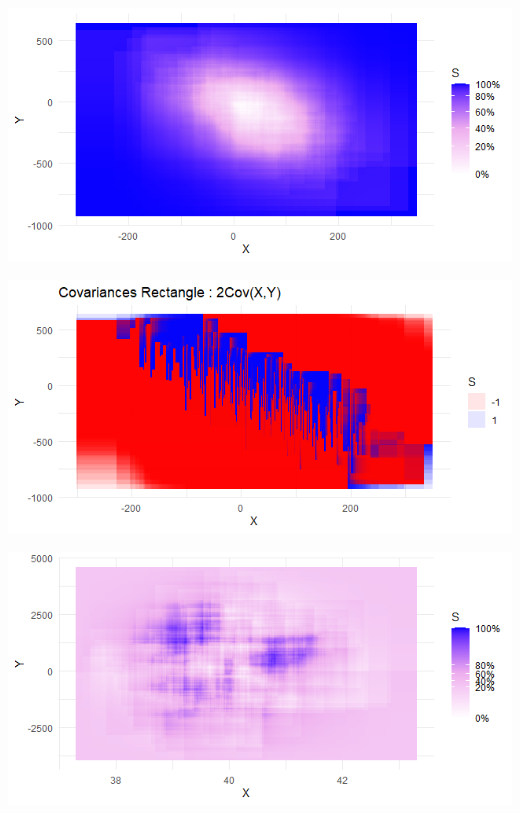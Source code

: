\documentclass[
]{report}
\begin{document}
\begin{minipage}{0.45\textwidth}
    \includegraphics{graph_plotnetrec_normal.png}
\end{minipage} 
\hspace{3.5ex}
\begin{minipage}{0.45\textwidth}
    \includegraphics{plot_rect_normal.png}
\end{minipage}
\begin{minipage}{0.45\textwidth}
    \includegraphics{graph_plotnetrect_heterosk.png}
\end{minipage} 
\hspace{3.5ex}
\end{document}
